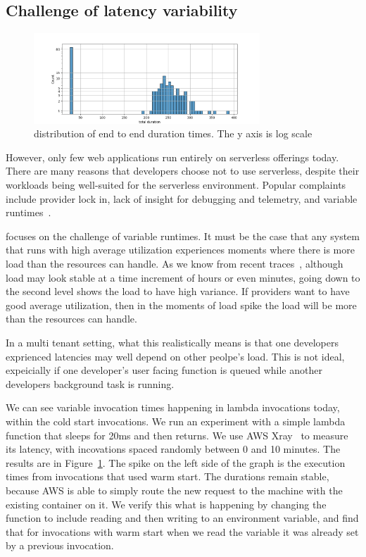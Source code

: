\subsection{Challenge of latency variability}


\begin{figure}[t!]
    \centering
      \includegraphics[width=8.5cm]{img/lambda_total_durations.png}
      \caption{ distribution of end to end duration times. The y axis is log scale }
    \label{fig:lambda-total-durations}
\end{figure}

However, only few web applications run entirely on serverless offerings today.
There are many reasons that developers choose not to use serverless, despite
their workloads being well-suited for the serverless environment. Popular
complaints include provider lock in, lack of insight for debugging and
telemetry, and variable runtimes~\cite{not-lambda-blog,reddit-serverless2}.


\Sys{} focuses on the challenge of variable runtimes. It must be the case that
any system that runs with high average utilization experiences moments where
there is more load than the resources can handle. As we know from recent
traces~\cite{prequal}, although load may look stable at a time increment of
hours or even minutes, going down to the second level shows the load to have
high variance. If providers want to have good average utilization, then in the
moments of load spike the load will be more than the resources can handle.

In a multi tenant setting, what this realistically means is that one
developers exprienced latencies may well depend on other peolpe's load. This is
not ideal, expeicially if one developer's user facing function is queued while
another developers background task is running.

We can see variable invocation times happening in lambda invocations today, 
within the cold start invocations. We run an experiment with a simple lambda
function that sleeps for 20ms and then returns. We use AWS Xray~\cite{aws-xray}
to measure its latency, with incovations spaced randomly between 0 and 10
minutes. The results are in Figure~\ref{fig:lambda-total-durations}. The spike
on the left side of the graph is the execution times from invocations that used
warm start. The durations remain stable, because AWS is able to simply route the
new request to the machine with the existing container on it. We verify this
what is happening by changing the function to include reading and then writing
to an environment variable, and find that for invocations with warm start when
we read the variable it was already set by a previous invocation.

